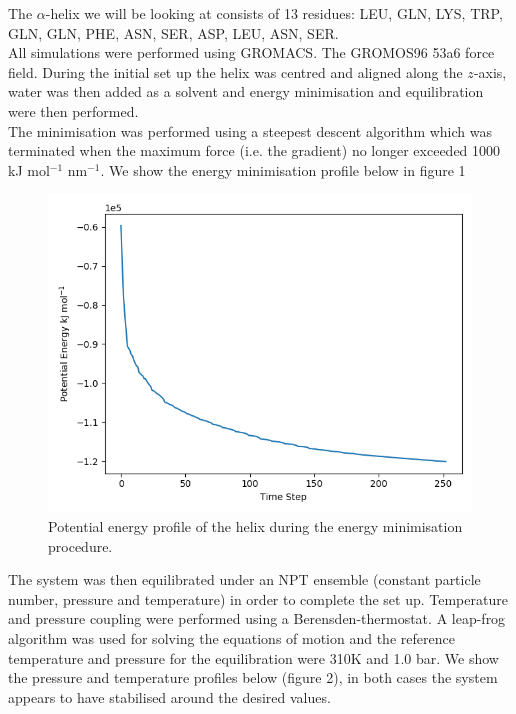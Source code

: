 \documentclass[12pt, onecolumn]{revtex4}    %
\begin{document}
The $\alpha$-helix we will be looking at consists of 13 residues: LEU, GLN, LYS, TRP, GLN, GLN, PHE, ASN, SER, ASP, LEU, ASN, SER.\\

All simulations were performed using GROMACS\cite{GMX}.  The GROMOS96 53a6 force field\cite{FF}.  During the initial set up the helix was centred and aligned along the $z$-axis, water was then added as a solvent and energy minimisation and equilibration were then performed.\\

The minimisation was performed using a steepest descent algorithm\cite{GMX} which was terminated when the maximum force (i.e. the gradient) no longer exceeded 1000 kJ mol$^{-1}$ nm$^{-1}$.  We show the energy minimisation profile below in figure 1\\

\begin{figure}[h!]
\includegraphics[scale=0.4]{HelixMin}
\caption{Potential energy profile of the helix during the energy minimisation procedure.}
\end{figure}

The system was then equilibrated under an NPT ensemble \cite{GMX} (constant particle number, pressure and temperature) in order to complete the set up.  Temperature and pressure coupling were performed using a Berensden-thermostat\cite{Ber}.  A leap-frog algorithm \cite{GMX} was used for solving the equations of motion and the reference temperature and pressure for the equilibration were 310K and 1.0 bar.   We show the pressure and temperature profiles below (figure 2), in both cases the system appears to have stabilised around the desired values.  
\end{document}
